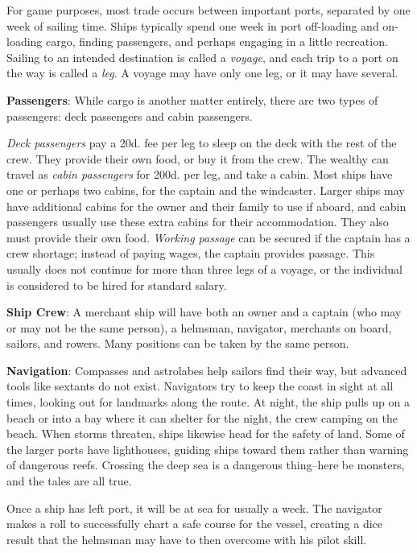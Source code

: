 \documentclass{book}
\begin{document}
For game purposes, most trade occurs between important ports, separated
by one week of sailing time. Ships typically spend one week in port
off-loading and on-loading cargo, finding passengers, and perhaps
engaging in a little recreation. Sailing to an intended destination is
called a \emph{voyage}, and each trip to a port on the way is called a
\emph{leg}. A voyage may have only one leg, or it may have several.

\textbf{Passengers}: While cargo is another matter entirely, there are
two types of passengers: deck passengers and cabin passengers.

\emph{Deck passengers} pay a 20d. fee per leg to sleep on the deck with
the rest of the crew. They provide their own food, or buy it from the
crew. The wealthy can travel as \emph{cabin passengers} for 200d. per
leg, and take a cabin. Most ships have one or perhaps two cabins, for
the captain and the windcaster. Larger ships may have additional cabins
for the owner and their family to use if aboard, and cabin passengers
usually use these extra cabins for their accommodation. They also must
provide their own food. \emph{Working passage} can be secured if the
captain has a crew shortage; instead of paying wages, the captain
provides passage. This usually does not continue for more than three
legs of a voyage, or the individual is considered to be hired for
standard salary.

\textbf{Ship Crew}: A merchant ship will have both an owner and a
captain (who may or may not be the same person), a helmsman, navigator,
merchants on board, sailors, and rowers. Many positions can be taken by
the same person.

\textbf{Navigation}: Compasses and astrolabes help sailors find their
way, but advanced tools like sextants do not exist. Navigators try to
keep the coast in sight at all times, looking out for landmarks along
the route. At night, the ship pulls up on a beach or into a bay where it
can shelter for the night, the crew camping on the beach. When storms
threaten, ships likewise head for the safety of land. Some of the larger
ports have lighthouses, guiding ships toward them rather than warning of
dangerous reefs. Crossing the deep sea is a dangerous thing--here be
monsters, and the tales are all true.

Once a ship has left port, it will be at sea for usually a week. The
navigator makes a roll to successfully chart a safe course for the
vessel, creating a dice result that the helmsman may have to then
overcome with his pilot skill.
\end{document}
